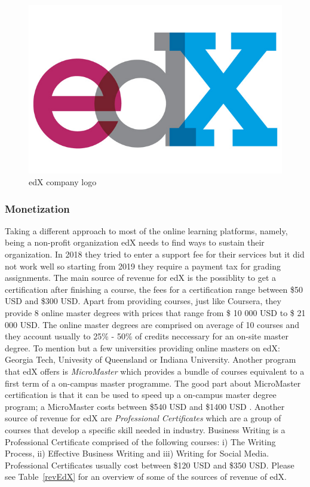 \documentclass[11]{article}
\begin{document}
\begin{figure}[H]

	\centering
	\includegraphics[width = 0.35 \textwidth]{edXLogo.jpg}
	\caption{edX company logo}
	\label{edXLogo}

\end{figure}
	\subsubsection{Monetization}
	Taking a different approach to most of the online learning platforms, namely, being a non-profit organization edX needs to find ways to sustain their organization. In 2018 they tried to enter a support fee for their services but it did not work well so starting from 2019 they require a payment tax for grading assignments. The main source of revenue for edX is the possiblity to get a certification after finishing a course, the fees for a certification range between \$50 USD and \$300 USD. Apart from providing courses, just like Coursera, they provide 8 online master degrees with prices that range from \$ 10 000 USD to \$ 21 000 USD. The online master degrees are comprised on average of 10 courses and they account usually to 25\% - 50\% of credits neccessary for an on-site master degree. To mention but a few universities providing online masters on edX: Georgia Tech, Univesity of Queensland or Indiana University. Another program that edX offers is \textit{MicroMaster} which provides a bundle of courses equivalent to a first term of a on-campus master programme. The good part about MicroMaster certification is that it can be used to speed up a on-campus master degree program; a MicroMaster costs between \$540 USD and \$1400 USD . Another source of revenue for edX are \textit{Professional Certificates} which are a group of courses that develop a specific skill needed in industry. Business Writing is a  Professional Certificate comprised of the following courses: i) The Writing Process, ii) Effective Business Writing and iii) Writing for Social Media. Professional Certificates usually cost between \$120 USD and \$350 USD. Please see Table~\ref{revEdX} for an overview of some of the sources of revenue of edX.
\end{document}
